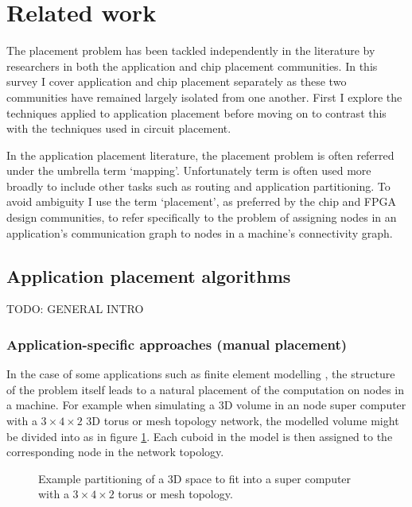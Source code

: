 	\section{Related work}
		
		The placement problem has been tackled independently in the literature by
		researchers in both the application and chip placement communities. In this
		survey I cover application and chip placement separately as these two
		communities have remained largely isolated from one another. First I
		explore the techniques applied to application placement before moving on to
		contrast this with the techniques used in circuit placement.
		
		In the application placement literature, the placement problem is often
		referred under the umbrella term `mapping'. Unfortunately term is often
		used more broadly to include other tasks such as routing and application
		partitioning. To avoid ambiguity I use the term `placement', as preferred
		by the chip and FPGA design communities, to refer specifically to the
		problem of assigning nodes in an application's communication graph to nodes
		in a machine's connectivity graph.
		
		\subsection{Application placement algorithms}
			
			TODO: GENERAL INTRO
			
			\subsubsection{Application-specific approaches (manual placement)}
				
				In the case of some applications such as finite element modelling
				\cite{bermejo13}, the structure of the problem itself leads to a
				natural placement of the computation on nodes in a machine. For example
				when simulating a 3D volume in an node super computer with a $3 \times
				4 \times 2$ 3D torus or mesh topology network, the modelled volume
				might be divided into as in figure \ref{fig:fem-partitioning}. Each
				cuboid in the model is then assigned to the corresponding node in the
				network topology.
				
				\begin{figure}
					\center
					
					\caption{Example partitioning of a 3D space to fit into a super
					computer with a $3\times4\times2$ torus or mesh topology.}
					\label{fig:fem-partitioning}
				\end{figure}
				
